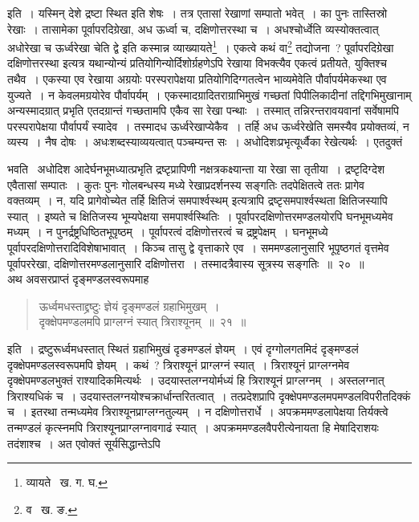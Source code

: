 \documentclass[11pt, openany]{book}
\begin{document}
\indent इति~। यस्मिन् देशे द्रष्टा स्थित इति शेषः~। तत्र एतासां रेखाणां सम्पातो भवेत्~। का पुनः तास्तिस्रो रेखाः~। तासामेका पूर्वापरदिग्रेखा, अध ऊर्ध्वा च, दक्षिणोत्तरस्था च~। अधश्चोर्ध्वेति व्यस्योक्तत्वात् अधोरेखा च ऊर्ध्वरेखा चेति द्वे
इति कस्मान्न व्याख्यायते\renewcommand{\thefootnote}{३}\footnote{व्यायते \textendash\ ख. ग. घ.}~। एकत्वे कथं वा\renewcommand{\thefootnote}{४}\footnote{व \textendash\ ख. ङ.} तद्योजना~? पूर्वापरदिग्रेखा दक्षिणोत्तरस्था इत्यत्र यथान्योन्यं प्रतियोगिन्योर्दिशोर्ग्रहणेऽपि रेखाया विभक्त्यैव एकत्वं प्रतीयते, युक्तिश्च तथैव~। एकस्या एव रेखाया अग्रयोः परस्परापेक्षया प्रतियोगिदिग्गतत्वेन भाव्यमेवेति पौर्वापर्यमेकस्था एव युज्यते~। न केवलमग्रयोरेव पौर्वापर्यम्~। एकस्मादग्रादितराग्राभिमुखं गच्छतां पिपीलिकादीनां तद्दिगभिमुखानाम् अन्यस्मादग्रात् प्रभृति एतदग्रान्तं गच्छतामपि एकैव सा रेखा पन्थाः~। तस्मात् तन्निरन्तरावयवानां सर्वेषामपि परस्परापेक्षया पौर्वापर्यं स्यादेव~। तस्मादध ऊर्ध्वरेखाप्येकैव~। तर्हि अध ऊर्ध्वरेखेति समस्यैव 
प्रयोक्तव्यं, न व्यस्य~। नैष दोषः~। अधःशब्दस्याव्ययत्वात् पञ्चम्यन्त सः~। अधोदिशःप्रभृत्यूर्ध्वैका रेखेत्यर्थः~। एतदुक्तं


\newpage

\noindent भवति \textendash\ अधोदिश आदेर्घनभूमध्यात्प्रभृति द्रष्टृप्रापिणी नक्षत्रकक्ष्यान्ता या रेखा सा तृतीया~। द्रष्टृदिग्देश एवैतासां सम्पातः~। कुतः पुनः गोलबन्धस्य मध्ये रेखाप्रदर्शनस्य सङ्गतिः तदपेक्षितत्वे ततः प्रागेव वक्तव्यम्~। न, यदि प्रागेवोच्येत 
तर्हि {\qt क्षितिजं समपार्श्वस्थम्} इत्यत्रापि द्रष्टृसमपार्श्वस्थता क्षितिजस्यापि स्यात्~। इष्यते च क्षितिजस्य भूम्यपेक्षया समपार्श्वस्थितिः~। 
पूर्वापरदक्षिणोत्तरमण्डलयोरपि घनभूमध्यमेव मध्यम्~। न पुनर्द्रष्ट्रधिष्ठितभूपृष्ठम्~। पूर्वापरत्वं दक्षिणोत्तरत्वं च द्रष्ट्रपेक्षम्~। घनभूमध्ये 
पूर्वापरदक्षिणोत्तरादिविशेषाभावात्~। किञ्च तासु द्वे वृत्ताकारे एव~। सममण्डलानुसारि भूपृष्ठगतं वृत्तमेव पूर्वापररेखा, दक्षिणोत्तरमण्डलानुसारि दक्षिणोत्तरा~। तस्मादत्रैवास्य सूत्रस्य सङ्गतिः~॥~२०~॥ \\

\indent अथ अवसरप्राप्तं दृङ्मण्डलस्वरूपमाह\textendash 

\begin{quote}
{\ab ऊर्ध्वमधस्ताद्द्रष्टुः ज्ञेयं दृङ्मण्डलं ग्रहाभिमुखम्~। \\
 दृक्क्षेपमण्डलमपि प्राग्लग्नं स्यात् त्रिराश्यूनम्~॥~२१~॥} 
\end{quote}

\indent इति~। द्रष्टुरूर्ध्वमधस्तात् स्थितं ग्रहाभिमुखं दृङमण्डलं ज्ञेयम्~। एवं दृग्गोलगतमिदं दृङ्मण्डलं 
दृक्क्षेपमण्डलस्वरूपमपि ज्ञेयम्~। कथं~? त्रिराश्यूनं प्राग्लग्नं स्यात्~। त्रिराश्यूनं प्राग्लग्नमेव दृक्क्षेपमण्डलभुक्तं राश्यादिकमित्यर्थः~। उदयास्तलग्नयोर्मध्यं हि त्रिराश्यूनं प्राग्लग्नम्~। अस्तलग्नात् त्रिराश्यधिकं च~। उदयास्तलग्नयोश्चक्रार्धान्तरितत्वात्~। तत्प्रदेशप्रापि 
दृक्क्षेपमण्डलमपमण्डलविपरीतदिक्कं च~। इतरथा तन्मध्यमेव त्रिराश्यूनप्राग्लग्नतुल्यम्~। न दक्षिणोत्तरार्धे~। अपक्रममण्डलापेक्षया तिर्यक्त्वे तन्मण्डलं कृत्स्नमपि त्रिराश्यूनप्राग्लग्नावगाढं स्यात्~। अपक्रममण्डलवैपरीत्येनायता हि मेषादिराशयः तदंशाश्च~। अत एवोक्तं सूर्यसिद्धान्तेऽपि\textendash  
\end{document}
